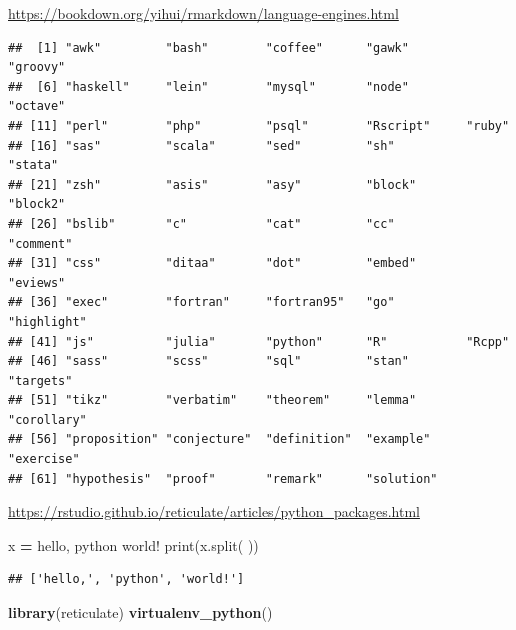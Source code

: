 \documentclass[
]{book}
\newenvironment{Shaded}{\begin{snugshade}}{\end{snugshade}}
\newcommand{\BuiltInTok}[1]{#1}
\newcommand{\FunctionTok}[1]{\textcolor[rgb]{0.13,0.29,0.53}{\textbf{#1}}}
\newcommand{\NormalTok}[1]{#1}
\newcommand{\OperatorTok}[1]{\textcolor[rgb]{0.81,0.36,0.00}{\textbf{#1}}}
\newcommand{\SpecialCharTok}[1]{\textcolor[rgb]{0.81,0.36,0.00}{\textbf{#1}}}
\newcommand{\StringTok}[1]{\textcolor[rgb]{0.31,0.60,0.02}{#1}}
\theoremstyle{definition}
\theoremstyle{definition}
\theoremstyle{definition}
\theoremstyle{definition}
\theoremstyle{remark}
\begin{document}
\url{https://bookdown.org/yihui/rmarkdown/language-engines.html}

\begin{Shaded}
\end{Shaded}

\begin{verbatim}
##  [1] "awk"         "bash"        "coffee"      "gawk"        "groovy"     
##  [6] "haskell"     "lein"        "mysql"       "node"        "octave"     
## [11] "perl"        "php"         "psql"        "Rscript"     "ruby"       
## [16] "sas"         "scala"       "sed"         "sh"          "stata"      
## [21] "zsh"         "asis"        "asy"         "block"       "block2"     
## [26] "bslib"       "c"           "cat"         "cc"          "comment"    
## [31] "css"         "ditaa"       "dot"         "embed"       "eviews"     
## [36] "exec"        "fortran"     "fortran95"   "go"          "highlight"  
## [41] "js"          "julia"       "python"      "R"           "Rcpp"       
## [46] "sass"        "scss"        "sql"         "stan"        "targets"    
## [51] "tikz"        "verbatim"    "theorem"     "lemma"       "corollary"  
## [56] "proposition" "conjecture"  "definition"  "example"     "exercise"   
## [61] "hypothesis"  "proof"       "remark"      "solution"
\end{verbatim}

\url{https://rstudio.github.io/reticulate/articles/python_packages.html}

\begin{Shaded}
\begin{Highlighting}[]
\NormalTok{x }\OperatorTok{=} \StringTok{\textquotesingle{}hello, python world!\textquotesingle{}}
\BuiltInTok{print}\NormalTok{(x.split(}\StringTok{\textquotesingle{} \textquotesingle{}}\NormalTok{))}
\end{Highlighting}
\end{Shaded}

\begin{verbatim}
## ['hello,', 'python', 'world!']
\end{verbatim}

\begin{Shaded}
\begin{Highlighting}[]
\FunctionTok{library}\NormalTok{(reticulate)}
\FunctionTok{virtualenv\_python}\NormalTok{()}
\end{Highlighting}
\end{Shaded}
\end{document}
